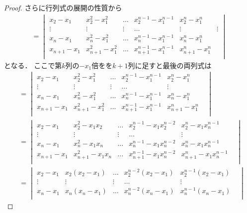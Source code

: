 \documentclass[leqno, a4paper, 12pt]{jsarticle}
\begin{document}
\begin{proof}
さらに行列式の展開の性質から
\begin{align*}
=
\begin{vmatrix}
 x_{2}-x_{1} & x_{2}^{2}-x_{1}^{2} & \dots & x_{2}^{n-1}-x_{1}^{n-1} & x_{2}^{n}-x_{1}^{n}\\
\vdots & \vdots  &  \vdots & \dots &\vdots & \vdots\\
 x_{n}-x_{1} & x_{n}^{2} -x_{1}^{2}& \dots & x_{n}^{n-1}-x_{1}^{n-1} & x_{n}^{n}-x_{1}^{n}\\
 x_{n+1} -x_{1}& x_{n+1}^{2}-x_{1}^{2} & \dots & x_{n+1}^{n-1} -x_{1}^{n-1}& x_{n+1}^{n}-x_{1}^{n}\\
\end{vmatrix}
\end{align*}
となる．
ここで第$k$列の$-x_{1}$倍をを$k+1$列に足すと最後の両列式は
\begin{align*}
&=
\begin{vmatrix}
 x_{2}-x_{1} & x_{2}^{2}-x_{1}^{2} & \dots & x_{2}^{n-1}-x_{1}^{n-1} & x_{2}^{n}-x_{1}^{n}\\
\vdots & \vdots  &  \vdots & \dots &\vdots & \\
 x_{n}-x_{1} & x_{n}^{2} -x_{1}^{2}& \dots & x_{n}^{n-1}-x_{1}^{n-1} & x_{n}^{n}-x_{1}^{n}\\
 x_{n+1} -x_{1}& x_{n+1}^{2}-x_{1}^{2} & \dots & x_{n+1}^{n-1} -x_{1}^{n-1}& x_{n+1}^{n}-x_{1}^{n}\\
\end{vmatrix}
\\
&=
\begin{vmatrix}
 x_{2}-x_{1} & x_{2}^{2}-x_{1}x_{2} & \dots & x_{2}^{n-1}-x_{1}x_{2}^{n-2} & x_{2}^{n}-x_{1}x_{n}^{n-1}\\
\vdots & \vdots  &  \vdots & \dots &\vdots & \\
 x_{n}-x_{1} & x_{n}^{2} -x_{1}x_{n}& \dots & x_{n}^{n-1}-x_{1}x_{n}^{n-2} & x_{n}^{n}-x_{1}x_{n}^{n-1}\\
 x_{n+1} -x_{1}& x_{n+1}^{2}-x_{1}x_{n} & \dots & x_{n+1}^{n-1} -x_{1}x_{n}^{n-2}& x_{n+1}^{n}-x_{1}x_{n}^{n-1}\\
\end{vmatrix}
\\
&=
\begin{vmatrix}
 x_{2}-x_{1} & x_{2}(x_{2}-x_{1}) & \dots & x_{2}^{n-2}(
 x_{2}-x_{1}) & x_{2}^{n-1}(x_{2}-x_{1})\\
\vdots & \vdots  &  \vdots & \dots &\vdots & \\
 x_{n}-x_{1} & x_{n}(x_{n} -x_{1})& \dots & x_{n}^{n-2}(x_{n}-x_{1}) & x_{n}^{n-1}(x_{n}-x_{1})\\

\end{vmatrix}
\end{align*}
\end{proof}
\end{document}

